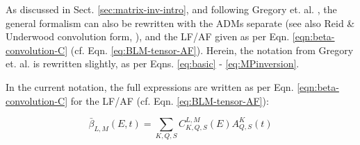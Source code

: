 









As discussed in Sect. \ref{sec:matrix-inv-intro}, and following Gregory et. al. \cite{gregory2021MolecularFramePhotoelectron}, the general formalism can also be rewritten with the ADMs separate (see also Reid \& Underwood convolution form, \cite{Reid2000}), and the LF/AF given as per Eqn. \ref{eqn:beta-convolution-C} (cf. Eqn. \ref{eq:BLM-tensor-AF}). Herein, the notation from Gregory et. al. \cite{gregory2021MolecularFramePhotoelectron} is rewritten slightly, as per Eqns. \ref{eq:basic} - \ref{eq:MPinversion}.

In the current notation, the full expressions are written as per Eqn. \ref{eqn:beta-convolution-C} for the LF/AF (cf. Eqn. \ref{eq:BLM-tensor-AF}):

\begin{equation}
\bar{\beta}_{L,M}(E,t)=\sum_{K,Q,S}C_{K,Q,S}^{L,M}(E)A_{Q,S}^{K}(t)
\end{equation}

